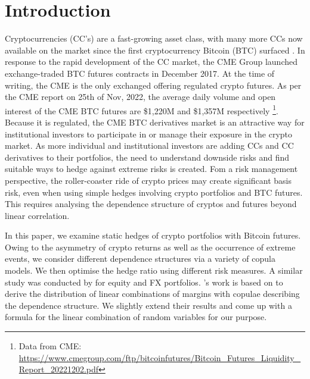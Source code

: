 \documentclass[11pt,a4paper,english]{article}
\begin{document}
\section{Introduction}\label{sec:introduction}
Cryptocurrencies (CC's) are a fast-growing asset class,
with many more CCs now available on the market since the first
cryptocurrency Bitcoin (BTC) surfaced \citep{nakamoto2009}.
In response to the rapid development of the CC market, the CME Group
launched exchange-traded BTC futures contracts in December
2017.
At the time of writing, the CME is the only exchanged offering
regulated crypto futures. 
As per the CME report on 25th of Nov, 2022, the average daily volume and open interest of the CME BTC futures are
\$1,220M and \$1,357M respectively \footnote{Data from CME: \url{https://www.cmegroup.com/ftp/bitcoinfutures/Bitcoin_Futures_Liquidity_Report_20221202.pdf}}.
Because it is regulated, the CME BTC derivatives market  
is an attractive way for institutional
investors to participate in or manage their exposure in the crypto
market.
As more individual and institutional investors are adding CCs and CC
derivatives to their portfolios, the need to understand
downside risks and find suitable ways to hedge against extreme risks
is created. 
Fom a risk management perspective, the roller-coaster ride
of crypto prices may create significant basis risk, even when using
simple hedges involving crypto portfolios and BTC futures. This
requires analysing the dependence structure of cryptos and
futures beyond linear correlation. 

In this paper, we examine static hedges of crypto portfolios
with Bitcoin futures. Owing to the asymmetry of crypto returns as
well as the occurrence of extreme events, we consider different 
dependence structures via a variety of copula models. We then optimise
the hedge ratio using different risk measures. A similar study was
conducted by \citep{barbi2014copula} for equity and FX portfolios.
\citet{barbi2014copula}'s work is based on \citet{cherubini2011copula}
to derive the distribution of linear combinations of margins with
copulae describing the dependence structure. We slightly extend their
results and come up with a formula for the linear combination of
random variables for our purpose.
\end{document}
